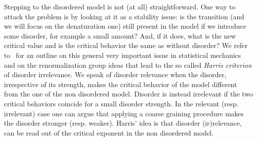 \documentclass[10pt]{amsart}
\theoremstyle{definition}\newtheorem{defi}[theo]{Definition}\newtheorem{rema}[theo]{Remark}\newtheorem{exam}[theo]{Example}\newtheorem{exem}[theo]{Example}\newtheorem{nota}[theo]{Notation}
\begin{document}
Stepping to the disordered model is not (at all) straightforward. One way to attack the problem is by looking at it as a stability issue: is the transition (and we will focus on the denaturation one) still present in the model if we introduce some disorder, for example a small amount? And, if it does, what is the new critical value and is the critical behavior the same as without disorder? We refer to~\cite[Chapter~5]{cf:GB} for an outline on this general very important issue in statistical mechanics and on the renormalization group ideas that lead to the so called \emph{Harris criterion} of disorder irrelevance. We speak of disorder relevance when the disorder, irrespective of its strength, makes the critical behavior of the model different from the one of the non disordered model. Disorder is instead irrelevant if the two critical behaviors coincide for a small disorder strength. In the relevant (resp. irrelevant) case one can argue that applying a coarse graining procedure makes the disorder stronger (resp. weaker). Harris' idea is that disorder (ir)relevance, can be read out of the critical exponent in the non disordered model.
\end{document}
